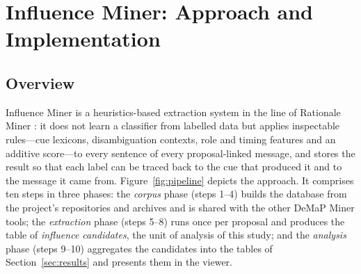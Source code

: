 \section{Influence Miner: Approach and Implementation}
\label{sec:approach}

\subsection{Overview}
\label{sec:overview}

Influence Miner is a heuristics-based extraction system in the line of Rationale Miner \cite{sharma2021rationale}: it does not learn a classifier from labelled data but applies inspectable rules---cue lexicons, disambiguation contexts, role and timing features and an additive score---to every sentence of every proposal-linked message, and stores the result so that each label can be traced back to the cue that produced it and to the message it came from. Figure~\ref{fig:pipeline} depicts the approach. It comprises ten steps in three phases: the \emph{corpus} phase (steps 1--4) builds the database from the project's repositories and archives and is shared with the other DeMaP Miner tools; the \emph{extraction} phase (steps 5--8) runs once per proposal and produces the table of \emph{influence candidates}, the unit of analysis of this study; and the \emph{analysis} phase (steps 9--10) aggregates the candidates into the tables of Section~\ref{sec:results} and presents them in the viewer.

